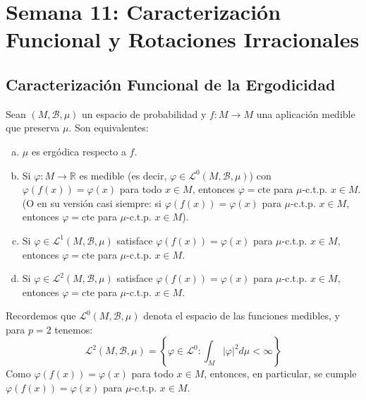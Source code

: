 
\chapter{Semana 11: Caracterización Funcional y Rotaciones Irracionales}

\section{Caracterización Funcional de la Ergodicidad}

\begin{teorema} \label{teo:caracterizacion_funcional}
	Sean $(M, \mathcal{B}, \mu)$ un espacio de probabilidad y $f: M \to M$ una aplicación medible que preserva $\mu$. Son equivalentes:
	\begin{enumerate}[a)]
		\item $\mu$ es ergódica respecto a $f$.
		\item Si $\varphi: M \to \mathbb{R}$ es medible (es decir, $\varphi \in \mathcal{L}^0(M, \mathcal{B}, \mu)$) con $\varphi(f(x)) = \varphi(x)$ para todo $x \in M$, entonces $\varphi = \text{cte}$ para $\mu$-c.t.p. $x \in M$. \\
		(O en su versión casi siempre: si $\varphi(f(x)) = \varphi(x)$ para $\mu$-c.t.p. $x \in M$, entonces $\varphi = \text{cte}$ para $\mu$-c.t.p. $x \in M$).
		\item Si $\varphi \in \mathcal{L}^1(M, \mathcal{B}, \mu)$ satisface $\varphi(f(x)) = \varphi(x)$ para $\mu$-c.t.p. $x \in M$, entonces $\varphi = \text{cte}$ para $\mu$-c.t.p. $x \in M$.
		\item Si $\varphi \in \mathcal{L}^2(M, \mathcal{B}, \mu)$ satisface $\varphi(f(x)) = \varphi(x)$ para $\mu$-c.t.p. $x \in M$, entonces $\varphi = \text{cte}$ para $\mu$-c.t.p. $x \in M$.
	\end{enumerate}
\end{teorema}

\begin{observacion}
	Recordemos que $\mathcal{L}^0(M, \mathcal{B}, \mu)$ denota el espacio de las funciones medibles, y para $p = 2$ tenemos:
	$$ \mathcal{L}^2(M, \mathcal{B}, \mu) = \left\{ \varphi \in \mathcal{L}^0 : \int_M |\varphi|^2 d\mu < \infty \right\} $$
	Como $\varphi(f(x)) = \varphi(x)$ para todo $x \in M$, entonces, en particular, se cumple $\varphi(f(x)) = \varphi(x)$ para $\mu$-c.t.p. $x \in M$.
\end{observacion}

